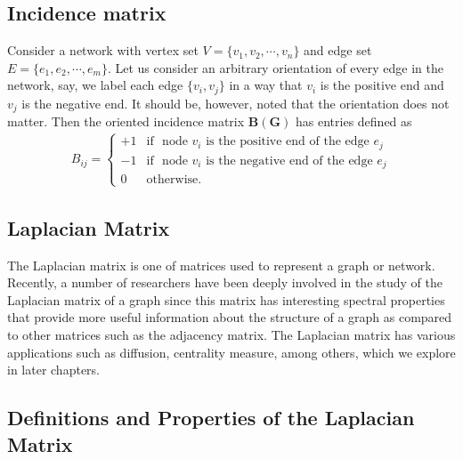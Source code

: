 \documentclass[10pt,a4paper]{article}
\begin{document}
\subsection{Incidence matrix}
	Consider a network with vertex set $V=\{v_1,v_2, \cdots,v_n\}$ and edge set $E =\{e_1,e_2,\cdots,e_m \}$. Let us consider an arbitrary orientation of every edge in the network, say, we label each edge $\{v_i,v_j\}$ in a way that $v_i$ is the positive end and $v_j$ is the negative end. It should be, however, noted that the orientation does not matter. Then the oriented incidence matrix $\mathbf{B(G)}$ has entries defined as
	\begin{eqnarray}
	B_{ij} = \begin{cases} +1 &\mbox{if } \text{ node $v_i$ is the positive end of the edge } e_j \\
	-1 &\mbox{if }  \text{ node $v_i$ is the negative end of the edge } e_j\\
	0 & \text{otherwise}.
	\end{cases}
	\end{eqnarray}

\subsection{Laplacian Matrix}
The Laplacian matrix is one of matrices used to represent a graph or network. Recently, a number of researchers have been deeply involved in the study of the Laplacian matrix of a graph since this matrix has interesting spectral properties that provide more useful information about the structure of a graph as compared to other matrices such as the adjacency matrix. The Laplacian matrix has various applications such as diffusion, centrality measure, among others, which we explore in later chapters.

\subsection{Definitions and Properties of the Laplacian Matrix}
\end{document}

